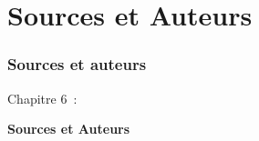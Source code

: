 %

\section{Sources et Auteurs}
\begin{frame}[fragile]
	\frametitle{Sources et auteurs}

	\begin{center}\huge{Chapitre 6~:}\end{center}
	\begin{center}\huge{\color{typo3darkgrey}\textbf{Sources et Auteurs}}\end{center}

\end{frame}


